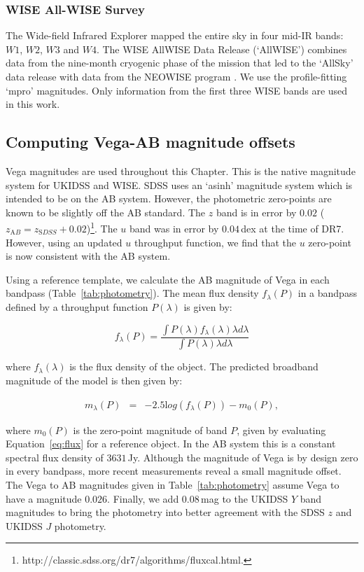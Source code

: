 \subsubsection{WISE All-WISE Survey}

The Wide-field Infrared Explorer \citep[WISE;][]{wright10} mapped the entire sky in four mid-IR bands: $W1$, $W2$, $W3$ and $W4$. 
The WISE AllWISE Data Release (`AllWISE') combines data from the nine-month cryogenic phase of the mission that led to the `AllSky' data release with data from the NEOWISE program \citep{mainzer11}. 
We use the profile-fitting `mpro' magnitudes.   
Only information from the first three WISE bands are used in this work.

\subsection{Computing Vega-AB magnitude offsets}

Vega magnitudes are used throughout this Chapter. 
This is the native magnitude system for UKIDSS and WISE.
SDSS uses an `asinh' magnitude system which is intended to be on the AB system.
However, the photometric zero-points are known to be slightly off the AB standard. 
The $z$ band is in error by $0.02$ ($z_{\mathrm AB} = z_{\mathrm SDSS} + 0.02$)\footnote{http://classic.sdss.org/dr7/algorithms/fluxcal.html.}.
The $u$ band was in error by $0.04$\,dex at the time of DR7. 
However, using an updated $u$ throughput function, we find that the $u$ zero-point is now consistent with the AB system. 

Using a reference template, we calculate the AB magnitude of Vega in each bandpass (Table~\ref{tab:photometry}). 
The mean flux density $f_\lambda(P)$ in a bandpass defined by a throughput function $P(\lambda)$ is given by: 

\begin{equation}
\label{eq:flux}
  f_\lambda(P) = \frac {\int P(\lambda)f_\lambda(\lambda)\lambda d\lambda} {\int P(\lambda)\lambda d\lambda} 
\end{equation}

where $f_\lambda(\lambda)$ is the flux density of the object. 
The predicted broadband magnitude of the model is then given by:   

\begin{eqnarray}
  m_\lambda(P) & = & -2.5{\mathrm log}(f_\lambda(P)) - m_0(P), 
\end{eqnarray}

where $m_0(P)$ is the zero-point magnitude of band $P$, given by evaluating Equation~\ref{eq:flux} for a reference object. 
In the AB system \citep{oke83} this is a constant spectral flux density of $3631$\,Jy. 
Although the magnitude of Vega is by design zero in every bandpass, more recent measurements reveal a small magnitude offset.  
The Vega to AB magnitudes given in Table~\ref{tab:photometry} assume Vega to have a magnitude $0.026$. 
Finally, we add $0.08$\,mag to the UKIDSS $Y$ band magnitudes to bring the photometry into better agreement with the SDSS $z$ and UKIDSS $J$ photometry. 


